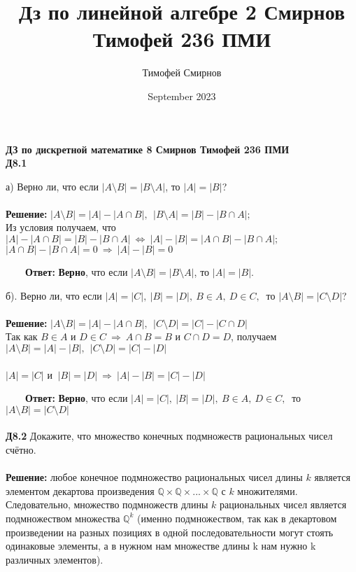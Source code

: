 \documentclass[a4paper, 12pt]{article}
\title{Дз по линейной алгебре 2 Смирнов Тимофей 236 ПМИ}
\author{Тимофей Смирнов}
\date{September 2023}
\begin{document}
    {\center \bf \large ДЗ по дискретной математике 8 Смирнов Тимофей 236 ПМИ}
    \\ \textbf{Д8.1}
    \\
    \par а) Верно ли, что если $|A \setminus B| = |B \setminus A|$, то $|A| = |B|$?
    \\
    \\ \textbf{Решение: } $|A \setminus B| = |A| - |A \cap B|, \ \ |B \setminus A| = |B| - |B \cap A|;$
    \\ Из условия получаем, что $|A| - |A \cap B| = |B| - |B \cap A| \ \Leftrightarrow \ |A| - |B| = |A \cap B| - |B \cap A|;$
    \\ $|A \cap B| - |B \cap A| = 0 \ \Rightarrow \ |A| - |B| = 0$
    \\
    \par \ \ \ \ \textbf{Ответ: } \textbf{Верно}, что если $|A \setminus B| = |B \setminus A|$, то $|A| = |B|$.
    \\
    \par б). Верно ли, что если $|A| = |C|, \ |B| = |D|, \ B \in A, \ D \in C, \ $ то $ |A \setminus B| = |C \setminus D|$?
    \\
    \\ \textbf{Решение: } $|A \setminus B| = |A| - |A \cap B|, \ \ |C \setminus D| = |C| - |C \cap D|$
    \\ Так как $B \in A$ и $ D \in C \ \Rightarrow \ A \cap B = B$ и $ C \cap D = D$, получаем $|A \setminus B| = |A| - |B|, \ \ |C \setminus D| = |C| - |D|$
    \\
    \\ $|A| = |C|$ и $\ |B| = |D| \ \Rightarrow \ |A| - |B| = |C| - |D|$
    \\
    \par \ \ \ \ \textbf{Ответ: } \textbf{Верно}, что если $|A| = |C|, \ |B| = |D|, \ B \in A, \ D \in C, \ $ то $ |A \setminus B| = |C \setminus D|$
    \\
    \\ \textbf{Д8.2} Докажите, что множество конечных подмножеств рациональных чисел счётно.
    \\
    \\ \textbf{Решение: } любое конечное подмножество рациональных чисел длины $k$ является элементом декартова произведения $\mathbb{Q} \times \mathbb{Q} \times ... \times \mathbb{Q}$ с $k$ множителями. Следовательно, множество подмножеств длины $k$ рациональных чисел является подмножеством множества $\mathbb{Q}^k$ (именно подмножеством, так как в декартовом произведении на разных позициях в одной последовательности могут стоять одинаковые элементы, а в нужном нам множестве длины k нам нужно k различных элементов).
\end{document}
